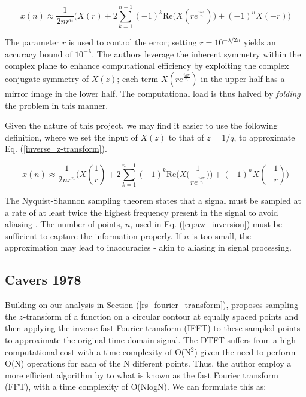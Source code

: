 \documentclass[a4paper]{report}
\begin{document}
\begin{equation}\label{aw_inversion_original}
	x(n) \approx \frac{1}{2nr^n} \biggr( X(r) + 2\sum^{n-1}_{k = 1} (-1)^k \mathrm{Re}\bigg( X(re^{\frac{ik\pi}{n}})\bigg) + (-1)^nX(-r) \biggl)
\end{equation}

The parameter $r$ is used to control the error; setting $r = 10^{-\lambda / 2n}$ yields an accuracy bound of $10^{-\lambda}$. The authors leverage the inherent symmetry within the complex plane to enhance computational efficiency by exploiting the complex conjugate symmetry of $X(z)$; each term $X(re^{\frac{ik\pi}{n}})$ in the upper half has a mirror image in the lower half. The computational load is thus halved by \textit{folding} the problem in this manner.

Given the nature of this project, we may find it easier to use the following definition, where we set the input of $X(z)$ to that of $z = 1 / q$, to approximate Eq. (\ref{inverse_z-transform}).

\begin{equation}\label{eq:aw_inversion}
	x(n) \approx \frac{1}{2nr^n} \biggr( X(\frac{1}{r}) + 2\sum^{n-1}_{k = 1} (-1)^k \text{Re}\bigg( X\big(\frac{1}{re^{\frac{ik\pi}{n}}}\big)\bigg) + (-1)^nX(-\frac{1}{r}) \biggl)
\end{equation}

The Nyquist-Shannon sampling theorem states that a signal must be sampled at a rate of at least twice the highest frequency present in the signal to avoid aliasing \citep{shannon1949communication,nyquist1928certain}. The number of points, $n$, used in Eq. (\ref{eq:aw_inversion}) must be sufficient to capture the information properly. If $n$ is too small, the approximation may lead to inaccuracies - akin to aliasing in signal processing.

\subsection{Cavers 1978}\label{section:cavers}
Building on our analysis in Section (\ref{rs_fourier_transform}), \citet{Cavers1978FFT} proposes sampling the $z$-transform of a function on a circular contour at equally spaced points and then applying the inverse fast Fourier transform (IFFT) to these sampled points to approximate the original time-domain signal. The DTFT suffers from a high computational cost with a time complexity of O(N$^2$) given the need to perform O(N) operations for each of the N different points. Thus, the author employ a more efficient algorithm by \citet{cooley1965algorithm} to what is known as the fast Fourier transform (FFT), with a time complexity of O(NlogN). We can formulate this as:
\end{document}
